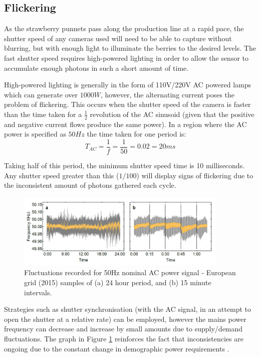 \documentclass[fleqn,twoside,12pt]{report}
\begin{document}
\subsection{Flickering}

As the strawberry punnets pass along the production line at a rapid pace, the shutter speed of any cameras used will need to be able to capture without blurring, but with enough light to illuminate the berries to the desired levels. The fast shutter speed requires high-powered lighting in order to allow the sensor to accumulate enough photons in such a short amount of time.

High-powered lighting is generally in the form of 110V/220V AC powered lamps which can generate over $1000W$, however, the alternating current poses the problem of flickering. This occurs when the shutter speed of the camera is faster than the time taken for a $\frac{1}{2}$ revolution of the AC sinusoid (given that the positive and negative current flows produce the same power). In a region where the AC power is specified as $50Hz$ the time taken for one period is: 
\begin{equation}
T_{AC} = \frac{1}{f} = \frac{1}{50} = 0.02 = 20ms
\end{equation}


Taking half of this period, the minimum shutter speed time is 10 milliseconds. Any shutter speed greater than this ($1/100$) will display signs of flickering due to the inconsistent amount of photons gathered each cycle. 


\begin{figure}[h]
	\centering
	\includegraphics[width=0.9\textwidth]{50hz.jpg}
	\caption{Fluctuations recorded for 50Hz nominal AC power signal - European grid (2015) samples of (a) 24 hour period, and (b) 15 minute intervals.}
	\label{fig:50hz}
\end{figure}

Strategies such as shutter synchronisation (with the AC signal, in an attempt to open the shutter at a relative rate) can be employed, however the mains power frequency can decrease and increase by small amounts due to supply/demand fluctuations. The graph in Figure \ref{fig:50hz} reinforces the fact that inconsistencies are ongoing due to the constant change in demographic power requirements \cite{50hz}.
\end{document}
